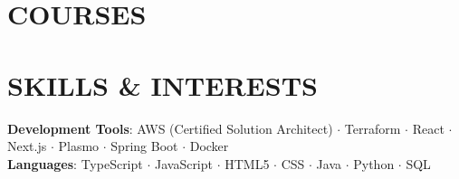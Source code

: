 \documentclass[letterpaper,11pt]{article}
\makeatletter
\newcommand{\resumeItem}[1]{
  \item\small{
    {#1 \vspace{-2pt}}
  }
}
\newcommand{\resumeSubheading}[4]{
  \vspace{-2pt}\item
    \begin{tabular*}{0.97\textwidth}[t]{l@{\extracolsep{\fill}}r}
      \textbf{#1} \textit{#2} & #3 \\
      \textit{\small#4} & \\
    \end{tabular*}\vspace{-7pt}
}
\newcommand{\resumeSubHeadingListEnd}{\end{itemize}}
\newcommand{\resumeItemListStart}{\begin{itemize}[leftmargin=0.15in]} %
\newcommand{\resumeItemListEnd}{\end{itemize}\vspace{-5pt}}
\makeatother
\begin{document}

\section{COURSES}


\section{SKILLS \& INTERESTS}
 \begin{itemize}[leftmargin=0.15in, label={}]
    \small{\item{
    \vspace{1mm}
    \textbf{Development Tools}{: AWS (Certified Solution Architect) {\bfseries\large$\cdot$} Terraform {\bfseries\large$\cdot$} React {\bfseries\large$\cdot$} Next.js {\bfseries\large$\cdot$} Plasmo  {\bfseries\large$\cdot$} Spring Boot {\bfseries\large$\cdot$} Docker } \\
    \vspace{1mm}
    \textbf{Languages}{: TypeScript {\bfseries\large$\cdot$} JavaScript {\bfseries\large$\cdot$} HTML5 {\bfseries\large$\cdot$} CSS {\bfseries\large$\cdot$} Java {\bfseries\large$\cdot$} Python {\bfseries\large$\cdot$} SQL} \\
    \vspace{1mm}

    }}
 \end{itemize}
 \begin{center}
\end{center}
\end{document}
